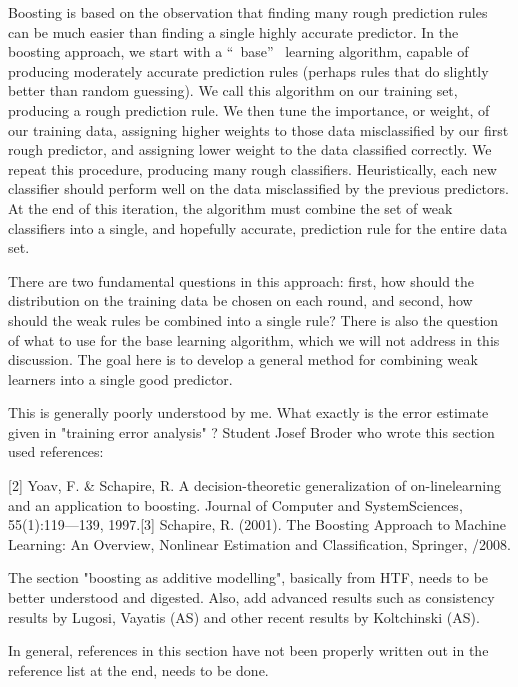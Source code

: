 \documentclass[11pt,twoside]{article}%
\theoremstyle{change}
\newenvironment{quote-env}{\begin{quote}\sffamily }{\end{quote}}
\newenvironment{mycomments-env}[1][Mycomments]{\textbf{#1.} \begin{quote-env} }{ \end{quote-env}  \ \rule{0.5em}{0.5em}}
\begin{document}
Boosting is based on the observation that finding many rough prediction rules
can be much easier than finding a single highly accurate predictor. In the
boosting approach, we start with a \textquotedblleft\ base\textquotedblright%
\ learning algorithm, capable of producing moderately accurate prediction
rules (perhaps rules that do slightly better than random guessing). We call
this algorithm on our training set, producing a rough prediction rule. We then
tune the importance, or weight, of our training data, assigning higher weights
to those data misclassified by our first rough predictor, and assigning lower
weight to the data classified correctly. We repeat this procedure, producing
many rough classifiers. Heuristically, each new classifier should perform well
on the data misclassified by the previous predictors. At the end of this
iteration, the algorithm must combine the set of weak classifiers into a
single, and hopefully accurate, prediction rule for the entire data set.

There are two fundamental questions in this approach: first, how should the
distribution on the training data be chosen on each round, and second, how
should the weak rules be combined into a single rule? There is also the
question of what to use for the base learning algorithm, which we will not
address in this discussion. The goal here is to develop a general method for
combining weak learners into a single good predictor.%

\begin{mycomments}%


\begin{mycomments-env}
This is generally poorly understood by me. What exactly is the error estimate
given in "training error analysis" ? Student Josef Broder who wrote this
section used references:

[2] Yoav, F. \& Schapire, R. A decision-theoretic generalization of
on-linelearning and an application to boosting. Journal of Computer and
SystemSciences, 55(1):119---139, 1997.[3] Schapire, R. (2001). The Boosting
Approach to Machine Learning: An Overview, Nonlinear Estimation and
Classification, Springer, /2008.

The section "boosting as additive modelling", basically from HTF, needs to be
better understood and digested. Also, add advanced results such as consistency
results by Lugosi, Vayatis (AS) and other recent results by Koltchinski (AS).

In general, references in this section have not been properly written out in
the reference list at the end, needs to be done.
\end{mycomments-env}%

\end{mycomments}%
\end{document}
